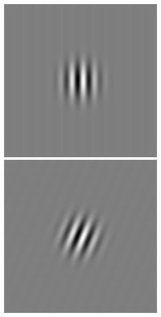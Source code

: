 \begin{figure}[ht]
\begin{center}
 \includegraphics[width=\columnwidth/9]{ch4/figures/iGabor4_0.jpg}
 \includegraphics[width=\columnwidth/9]{ch4/figures/iGabor4_1.jpg}

\end{center}
\end{figure}
